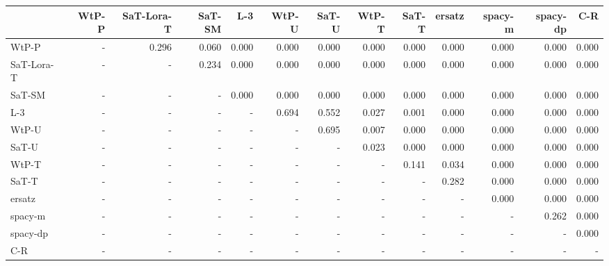 \begin{tabular}{lrrrrrrrrrrrr}
\toprule
 & WtP-P & SaT-Lora-T & SaT-SM & L-3 & WtP-U & SaT-U & WtP-T & SaT-T & ersatz & spacy-m & spacy-dp & C-R \\
\midrule
WtP-P & - & 0.296 & 0.060 & 0.000 & 0.000 & 0.000 & 0.000 & 0.000 & 0.000 & 0.000 & 0.000 & 0.000 \\
SaT-Lora-T & - & - & 0.234 & 0.000 & 0.000 & 0.000 & 0.000 & 0.000 & 0.000 & 0.000 & 0.000 & 0.000 \\
SaT-SM & - & - & - & 0.000 & 0.000 & 0.000 & 0.000 & 0.000 & 0.000 & 0.000 & 0.000 & 0.000 \\
L-3 & - & - & - & - & 0.694 & 0.552 & 0.027 & 0.001 & 0.000 & 0.000 & 0.000 & 0.000 \\
WtP-U & - & - & - & - & - & 0.695 & 0.007 & 0.000 & 0.000 & 0.000 & 0.000 & 0.000 \\
SaT-U & - & - & - & - & - & - & 0.023 & 0.000 & 0.000 & 0.000 & 0.000 & 0.000 \\
WtP-T & - & - & - & - & - & - & - & 0.141 & 0.034 & 0.000 & 0.000 & 0.000 \\
SaT-T & - & - & - & - & - & - & - & - & 0.282 & 0.000 & 0.000 & 0.000 \\
ersatz & - & - & - & - & - & - & - & - & - & 0.000 & 0.000 & 0.000 \\
spacy-m & - & - & - & - & - & - & - & - & - & - & 0.262 & 0.000 \\
spacy-dp & - & - & - & - & - & - & - & - & - & - & - & 0.000 \\
C-R & - & - & - & - & - & - & - & - & - & - & - & - \\
\bottomrule
\end{tabular}

